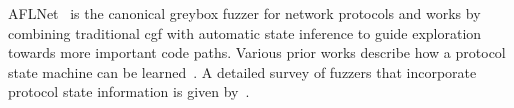 AFLNet~\cite{pham_aflnet_2020} is the canonical greybox fuzzer for network protocols
and works by combining traditional \gls{cgf} with automatic state inference to guide exploration
towards more important code paths.
Various prior works describe how a protocol state machine can be learned~\cite{dongol_grey-box_2020,marksteiner_learning_2025,giraud_l-scale_2026}.
A detailed survey of fuzzers that incorporate protocol state information is given by~\textcite{daniele_fuzzers_2023}.
